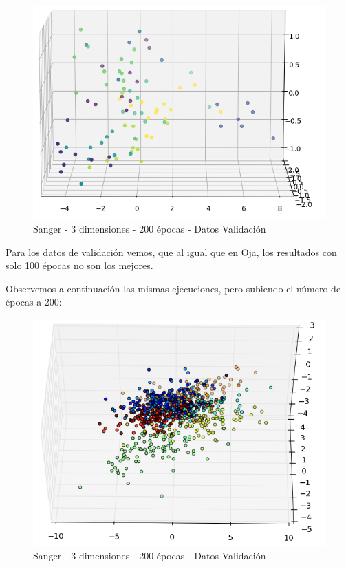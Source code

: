 \begin{figure}[h]
  \begin{center}
    \includegraphics[scale=0.65]{../img/ej1/sanger/sanger_3salida_100ep_validation_2.png}
  \caption{Sanger - 3 dimensiones - 200 épocas - Datos Validación}
  \end{center}
\end{figure}

\newpage

Para los datos de validación vemos, que al igual que en Oja, los resultados con solo 100 épocas no son los mejores.

Observemos a continuación las mismas ejecuciones, pero subiendo el número de épocas a 200:

\begin{figure}[h]
  \begin{center}
    \includegraphics[scale=0.75]{../img/ej1/sanger/sanger_3salida_200ep_train_2.png}
  \caption{Sanger - 3 dimensiones - 200 épocas - Datos Validación}
  \end{center}
\end{figure}

